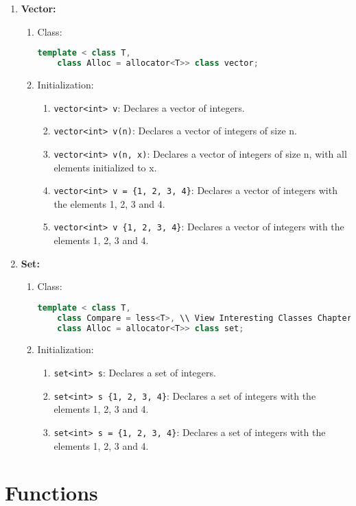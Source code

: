 \documentclass{article}
\begin{document}
\begin{enumerate}
  \item \textbf{Vector:}
    \begin{enumerate}
      \item Class:
	\begin{lstlisting}[language=C++]
	template < class T,
	class Alloc = allocator<T>> class vector;
	\end{lstlisting}
      \item Initialization:
	\begin{enumerate}
	  \item \texttt{vector<int> v}: Declares a vector of integers.
	  \item \texttt{vector<int> v(n)}: Declares a vector of integers of size n.
	  \item \texttt{vector<int> v(n, x)}: Declares a vector of integers of size n, with all elements initialized to x.
	  \item \texttt{vector<int> v = \{1, 2, 3, 4\}}: Declares a vector of integers with the elements 1, 2, 3 and 4.
	  \item \texttt{vector<int> v \{1, 2, 3, 4\}}: Declares a vector of integers with the elements 1, 2, 3 and 4.
	\end{enumerate}
    \end{enumerate}
  \item \textbf{Set:}
    \begin{enumerate}
      \item Class:
	\begin{lstlisting}[language=C++]
	template < class T,
	class Compare = less<T>, \\ View Interesting Classes Chapter for more information
	class Alloc = allocator<T>> class set;
	\end{lstlisting}
      \item Initialization:
	\begin{enumerate}
	  \item \texttt{set<int> s}: Declares a set of integers.
	  \item \texttt{set<int> s \{1, 2, 3, 4\}}: Declares a set of integers with the elements 1, 2, 3 and 4.
	  \item \texttt{set<int> s = \{1, 2, 3, 4\}}: Declares a set of integers with the elements 1, 2, 3 and 4.
	\end{enumerate}
    \end{enumerate}
\end{enumerate}
\section{Functions}
\end{document}
